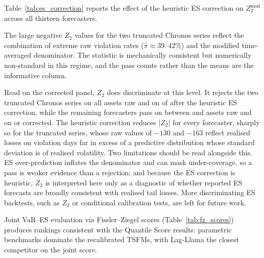 \documentclass[preprint,11pt,authoryear]{elsarticle}
\newcommand{\1}{\boldsymbol{1}}
\begin{document}
Table~\ref{tab:es_correction} reports the effect of the heuristic ES
correction on $Z_2^{\mathrm{mod}}$ across all thirteen forecasters.

\begin{table}[htbp]
	\centering
	\caption{Heuristic ES correction results (mean across 24 assets,
		$\alpha = 0.01$). The columns report $Z_2^{\mathrm{mod}}$, the
		time-averaged-denominator variant of
		equation~\eqref{eq:app_z2_mod}, not the per-date $Z_2$ of
		equation~\eqref{eq:app_z2} used in
		Supplement~\ref{app:es_empirical}; pass criterion follows
		Appendix~\ref{app:backtesting}.}
	\label{tab:es_correction}
	\footnotesize
	
	\begin{minipage}{\linewidth}\scriptsize
		\smallskip
		The large negative $Z_2$ values for the two truncated Chronos series
		reflect the combination of extreme raw violation rates
		($\hat\pi \approx 39$--$42\%$) and the modified time-averaged
		denominator. The statistic is mechanically consistent but numerically
		non-standard in this regime, and the pass counts rather than the means
		are the informative column.
	\end{minipage}
\end{table}

Read on the corrected panel, $Z_2$ does discriminate at this level. It rejects
the two truncated Chronos series on all \nMainAssets{} assets raw and on
\nMainZTwoRejCorrTrunc{} of
\nMainAssets{} after the heuristic ES correction, while the remaining forecasters
pass on between \nMainZTwoPassRawMin{} and \nMainAssets{} assets raw and on
\nMainZTwoPassCorrMin{} or \nMainAssets{}
corrected. The heuristic correction reduces $|Z_2|$ for every forecaster, sharply
so for the truncated series, whose raw values of $-130$ and $-163$ reflect
realised losses on violation days far in excess of a predictive distribution
whose standard deviation is \nDispDefaultSmall{} of realised volatility. Two limitations should be read
alongside this. ES over-prediction inflates the denominator and can mask
under-coverage, so a pass is weaker evidence than a rejection; and because the ES
correction is heuristic, $Z_2$ is interpreted here only as a diagnostic of
whether reported ES forecasts are broadly consistent with realised tail losses.
More discriminating ES backtests, such as $Z_3$ \citep{acerbi2014back} or
conditional calibration tests, are left for future work.

Joint VaR--ES evaluation via Fissler--Ziegel scores
(Table~\ref{tab:fz_scores}) produces rankings consistent with the Quantile
Score results: parametric benchmarks dominate the recalibrated TSFMs, with
Lag-Llama the closest competitor on the joint score.
\end{document}
